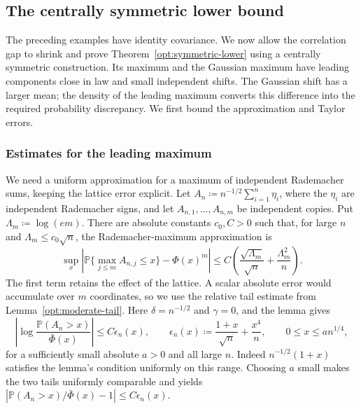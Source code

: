 \documentclass[11pt,letterpaper]{article}
\theoremstyle{remark}
\newcommand{\Pp}{\mathbb P}
\begin{document}
\subsection{The centrally symmetric lower bound}
\label{app:symmetric-lower}
The preceding examples have identity covariance. We now allow the
correlation gap to shrink and prove Theorem~\ref{opt:symmetric-lower}
using a centrally symmetric construction. Its maximum and the Gaussian
maximum have leading components close in law and small independent
shifts. The Gaussian shift has a larger mean; the density of the
leading maximum converts this difference into the required probability
discrepancy. We first bound the approximation and Taylor errors.

\subsubsection{Estimates for the leading maximum}

We need a uniform approximation for a maximum of independent
Rademacher sums, keeping the lattice error explicit. Let
\(A_n\coloneqq n^{-1/2}\sum_{i=1}^n\eta_i\), where the
\(\eta_i\) are independent Rademacher signs, and let
\(A_{n,1},\ldots,A_{n,m}\) be independent copies. Put
\(\Lambda_m\coloneqq\log(em)\). There are absolute constants
\(c_0,C>0\) such that, for large \(n\) and
\(\Lambda_m\le c_0\sqrt n\), the Rademacher-maximum approximation is
\begin{equation}
 \sup_x\left|\Pp\{\max_{j\le m}A_{n,j}\le x\}-\Phi(x)^m\right|
 \le C\left(\frac{\sqrt{\Lambda_m}}{\sqrt n}
                 +\frac{\Lambda_m^2}{n}\right).
 \label{sym:eq:rademacher-max}
\end{equation}
The first term retains the effect of the lattice. A scalar absolute
error would accumulate over \(m\) coordinates, so we use the relative
tail estimate from Lemma~\ref{opt:moderate-tail}. Here
\(\delta=n^{-1/2}\) and \(\gamma=0\), and the lemma gives
\[
 \left|\log\frac{\Pp(A_n>x)}{\bar\Phi(x)}\right|
 \le C\epsilon_n(x),\qquad
 \epsilon_n(x)\coloneqq\frac{1+x}{\sqrt n}+\frac{x^4}{n},
 \qquad 0\le x\le an^{1/4},
\]
for a sufficiently small absolute \(a>0\) and all large \(n\).
Indeed \(n^{-1/2}(1+x)\) satisfies the lemma's condition uniformly
on this range. Choosing \(a\) small makes the two tails uniformly
comparable and yields
\(\left|\Pp(A_n>x)/\bar\Phi(x)-1\right|\le C\epsilon_n(x)\).
\end{document}
